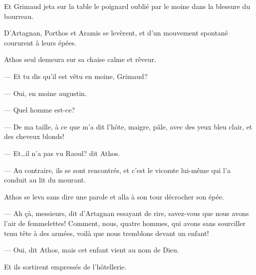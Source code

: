 Et Grimaud jeta sur la table le poignard oublié par le moine dans la blessure du bourreau.

D'Artagnan, Porthos et Aramis se levèrent, et d'un mouvement spontané coururent à leurs épées.

Athos seul demeura sur sa chaise calme et rêveur.

— Et tu dis qu'il est vêtu en moine, Grimaud?

— Oui, en moine augustin.

— Quel homme est-ce?

— De ma taille, à ce que m'a dit l'hôte, maigre, pâle, avec des yeux bleu clair, et des cheveux blonds!

— Et\dots il n'a pas vu Raoul? dit Athos.

— Au contraire, ils se sont rencontrés, et c'est le vicomte lui-même qui l'a conduit au lit du mourant.

Athos se leva sans dire une parole et alla à son tour décrocher son épée.

— Ah çà, messieurs, dit d'Artagnan essayant de rire, savez-vous que nous avons l'air de femmelettes! Comment, nous, quatre hommes, qui avons sans sourciller tenu tête à des armées, voilà que nous tremblons devant un enfant!

— Oui, dit Athos, mais cet enfant vient au nom de Dieu.

Et ils sortirent empressés de l'hôtellerie.